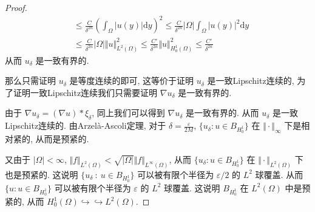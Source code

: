 \documentclass[11pt]{ctexart}[UTF8]
\begin{document}
\begin{proof}
\begin{equation*}
\begin{aligned}
                                                                &\leq \frac{C}{\delta^{2n}}\left( \int_{\Omega} |u(y)| \mathrm{d}y \right)^2 \leq \frac{C}{\delta^{2n}}|\Omega|\int_{\Omega} |u(y)|^2 \mathrm{d}y\\
                                                                &\leq \frac{C}{\delta^{2n}}|\Omega| \Vert u \Vert_{L^2(\Omega)}^2 \leq \frac{C'}{\delta^{2n}}\Vert u \Vert_{H_{0}^{1}(\Omega)}^2 \leq \frac{C'}{\delta^{2n}}
        \end{aligned}
    \end{equation*}
    从而 $u_{\delta}$ 是一致有界的.\par
    那么只需证明 $u_{\delta}$ 是等度连续的即可, 这等价于证明 $u_{\delta}$ 是一致Lipschitz连续的, 为了证明一致Lipschitz连续我们只需要证明 $\nabla u_{\delta}$ 是一致有界的.\par
    由于 $\nabla u_{\delta} = (\nabla u) \ast  \xi_{\delta}$, 同上我们可以得到 $\nabla u_{\delta}$ 是一致有界的. 从而 $u_{\delta}$ 是一致Lipschitz连续的. 
    由Arzelà-Ascoli定理, 对于 $\delta = \frac{\varepsilon}{2M}$, $\{ u_{\delta} : u \in B_{H_{0}^{1}} \}$ 在 $\Vert \cdot \Vert_{\infty}$ 下是相对紧的, 从而是预紧的.\par
    又由于 $|\Omega| < \infty$, $\Vert f \Vert_{L^2(\Omega)} < \sqrt{|\Omega|}\Vert f \Vert_{L^\infty(\Omega)}$, 从而 $\{ u_{\delta} : u \in B_{H_{0}^{1}} \}$ 在 $\Vert \cdot \Vert_{L^2(\Omega)}$ 下也是预紧的.
    这说明 $\{ u_{\delta}\ :\ u \in B_{H_{0}^{1}} \}$ 可以被有限个半径为 $\varepsilon/2$ 的 $L^2$ 球覆盖. 从而 $\{ u : u \in B_{H_{0}^{1}} \}$ 可以被有限个半径为 $\varepsilon$ 的 $L^2$ 球覆盖. 这说明 $B_{H_{0}^{1}}$ 在 $L^2(\Omega)$ 中是预紧的, 从而 $H_{0}^{1}(\Omega) \hookrightarrow\hookrightarrow L^2(\Omega)$.
\end{proof}
\end{document}
